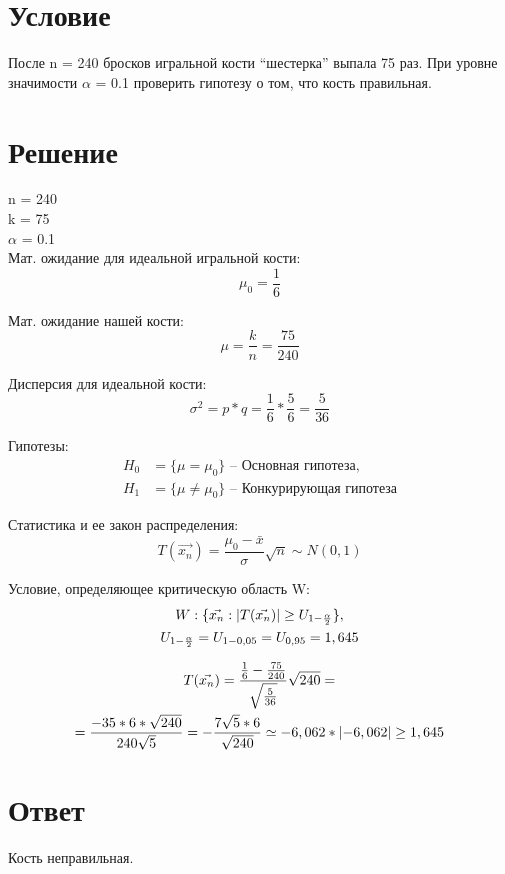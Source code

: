 
\section*{Условие} 
После n = 240 бросков игральной кости ``шестерка'' выпала 75 раз. При уровне значимости \(\alpha\) = 0.1 проверить гипотезу о том, что кость правильная.

\section*{Решение} 

n = 240 \\
k = 75 \\
\(\alpha\) = 0.1 \\

Мат. ожидание для идеальной игральной кости:
\begin{equation*}
	\mu_0 = \frac{1}{6}
\end{equation*}

Мат. ожидание нашей кости:
\begin{equation*}
	\mu = \frac{k}{n} = \frac{75}{240}
\end{equation*}

Дисперсия для идеальной кости:
\begin{equation*}
	\sigma^2 = p*q = \frac{1}{6}*\frac{5}{6} = \frac{5}{36}
\end{equation*}

Гипотезы:
\begin{align*}
	H_0 &= \{ \mu = \mu_0 \} \text{ -- Основная гипотеза}, \\
	H_1 &= \{ \mu \not= \mu_0 \} \text{ -- Конкурирующая гипотеза}
\end{align*}

Статистика и ее закон распределения:
\begin{equation*}
	T(\vec{x_n}) = \frac{\mu_0 - \bar{x}}{\sigma}\sqrt{n} \sim N(0, 1)
\end{equation*}

Условие, определяющее критическую область W:
\begin{gather*}
	W: \{ \vec{x_n}: \left|T(\vec{x_n})\right| \ge U_{1 - \frac{\alpha}{2}} \}, \\
	U_{1 - \frac{\alpha}{2}} = U_{1 - 0,05} = U_{0,95} = 1,645
\end{gather*}

\begin{gather*}
	T(\vec{x_n}) = \frac{ \frac{1}{6} - \frac{75}{240} }{ \sqrt{\frac{5}{36}} } \sqrt{240} = \\ 
	= \frac{ -35 * 6 * \sqrt{240} }{ 240 \sqrt{5} } = 
	- \frac{7\sqrt{5} * 6}{ \sqrt{240} } \simeq -6,062 * \left|-6,062\right| \ge 1,645 
\end{gather*}

\section*{Ответ} 
Кость неправильная.
